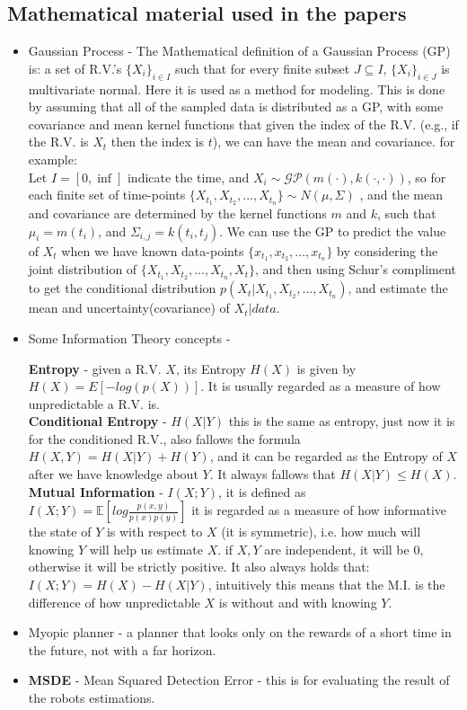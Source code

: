 \documentclass{article}
\begin{document}
	\subsection{Mathematical material used in the papers}
	\begin{itemize}
		\item Gaussian Process - The Mathematical definition of a Gaussian Process (GP) is:
		 a set of R.V.'s $\{X_i\}_{i \in I}$ such that for every finite subset $J \subseteq I$, $\{X_i\}_{i \in J}$ is multivariate normal.
		 Here it is used as a method for modeling. This is done by assuming that all of the sampled data is distributed as a GP, with some covariance and mean kernel functions that given the index of the R.V. 
		 (e.g., if the R.V. is $X_t$ then the index is $t$), we can have the mean and covariance. for example: \\
		 Let $I=[0,\inf]$ indicate the time, and ${X_i} \sim \mathcal{GP}(m(\cdot), k(\cdot,\cdot))$, so for each finite set of time-points
		 $\{X_{t_1},X_{t_2},...,X_{t_n}\} \sim N(\mu,\Sigma)$ , and the mean and covariance are determined by the kernel functions 
		 $m$ and $k$, such that $\mu_i = m(t_i)$, and $\Sigma_{i,j} = k(t_i, t_j)$. We can use the GP to predict the value of $X_t$ when we have known data-points $\{x_{t_1},x_{t_2},...,x_{t_n}\}$  by considering the joint distribution of $\{X_{t_1},X_{t_2},...,X_{t_n},X_t\}$, 
		 and then using Schur's compliment to get the conditional distribution $p(X_t|X_{t_1},X_{t_2},...,X_{t_n})$, and estimate the mean and uncertainty(covariance) of $X_t|data$.
		\item Some Information Theory concepts - 
		
		\textbf{Entropy} - given a R.V. $X$, its Entropy $H(X)$ is given by $H(X)=E[-log(p(X))]$. It is usually regarded as a measure of how unpredictable a R.V. is. \\ 
		
		\textbf{Conditional Entropy} - $H(X|Y)$  this is the same as entropy, just now it is for the conditioned R.V., also fallows the formula $H(X,Y)=H(X|Y) + H(Y)$, and it can be regarded as the Entropy of $X$ after we have knowledge about $Y$.
		It always fallows that $H(X|Y) \leq H(X)$. \\
		  
		\textbf{Mutual Information} - $I(X;Y)$, it is defined as $I(X;Y)=\mathbb{E}\left[log\frac{p(x,y)}{p(x)p(y)}\right]$ it is regarded as a measure of how informative the state of $Y$ is with respect to $X$ (it is symmetric), i.e. how much will knowing $Y$ will help us estimate $X$. if $X,Y$ are independent, it will be 0, otherwise it will be strictly positive.
		It also always holds that: $I(X;Y)=H(X)-H(X|Y)$, intuitively this means that the M.I. is the difference of how unpredictable $X$ is without and with knowing $Y$.  
		\item Myopic planner - a planner that looks only on the rewards of a short time in the future, not with a far horizon.
		
		\item \textbf{MSDE} - Mean Squared Detection Error - this is for evaluating the result of the robots estimations.
		
	\end{itemize}
	
\end{document}

